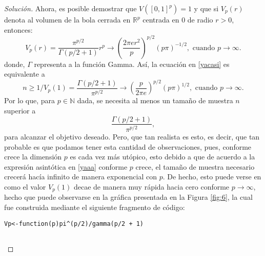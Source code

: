 \documentclass[10.5pt,notitlepage]{article}
\newenvironment{solucion}
  {\begin{proof}[Solución]}
  {\end{proof}}
\newcommand{\RR}{\mathbb{R}}
\newcommand{\NN}{\mathbb{N}}
\newcommand{\pare}[1]{\left( #1 \right)}
\theoremstyle{plain}
\begin{document}
\begin{solucion}
Ahora, es posible demostrar que \( V([0,1]^p) = 1\) y que si \(V_{p}(r)\) denota al volumen de la bola cerrada en \(\RR^p\) centrada en \(0\) de radio \(r >0\), entonces:
\[
   V_{p}(r) = \frac{\pi^{p/2}}{\Gamma(p/2 + 1)}r^p \to \pare{\frac{2\pi e r^2}{p}}^{p/2} (p\pi)^{-1/2}, \text{ cuando } p \to \infty.
\]
donde, \(\Gamma\) representa a la función Gamma. Así, la ecuación en \eqref{yacasi} es equivalente a
\begin{equation}\label{yaaa}
     n \geq 1/V_{p}(1) = \frac{\Gamma(p/2 + 1)}{\pi^{p/2}} \to \pare{\frac{p}{2\pi e}}^{p/2} (p\pi)^{1/2}, \text{ cuando } p \to \infty.  
\end{equation}
Por lo que, para \(p\in \NN\) dada, se necesita al menos un tamaño de muestra \(n\) superior a 
\[
\frac{\Gamma(p/2 + 1)}{\pi^{p/2}},
\]
para alcanzar el objetivo deseado. Pero, que tan realista es esto, es decir, que tan probable es que podamos tener esta cantidad de observaciones, pues, conforme crece la dimensión \(p\) es cada vez más utópico, esto debido a que de acuerdo a la expresión asintótica en \eqref{yaaa} conforme \(p\) crece, el tamaño de muestra necesario crecerá hacía infinito de manera exponencial con \(p\). De hecho, esto puede verse en como el valor \(V_{p}(1)\) decae de manera muy rápida hacia cero conforme \(p \to \infty\), hecho que puede observarse en la gráfica presentada en la Figura \ref{fig:6}, la cual fue construida mediante el siguiente fragmento de código:
\begin{verbatim}
Vp<-function(p)pi^(p/2)/gamma(p/2 + 1)  


\end{verbatim}
\end{solucion}
\end{document}
